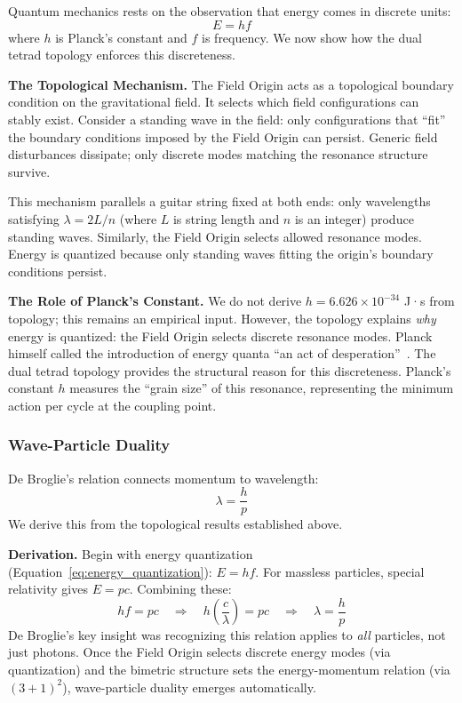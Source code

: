 \documentclass[aps,prd,preprint,superscriptaddress,showpacs,preprintnumbers,amsmath,amssymb,nofootinbib]{revtex4-2}
\begin{document}
Quantum mechanics rests on the observation that energy comes in discrete units:
\begin{equation}
E = hf
\label{eq:energy_quantization}
\end{equation}
where $h$ is Planck's constant and $f$ is frequency. We now show how the dual tetrad topology enforces this discreteness.

\textbf{The Topological Mechanism.}
The Field Origin acts as a topological boundary condition on the gravitational field. It selects which field configurations can stably exist. Consider a standing wave in the field: only configurations that ``fit'' the boundary conditions imposed by the Field Origin can persist. Generic field disturbances dissipate; only discrete modes matching the resonance structure survive.

This mechanism parallels a guitar string fixed at both ends: only wavelengths satisfying $\lambda = 2L/n$ (where $L$ is string length and $n$ is an integer) produce standing waves. Similarly, the Field Origin selects allowed resonance modes. Energy is quantized because only standing waves fitting the origin's boundary conditions persist.

\textbf{The Role of Planck's Constant.}
We do not derive $h = 6.626 \times 10^{-34}$ J·s from topology; this remains an empirical input. However, the topology explains \emph{why} energy is quantized: the Field Origin selects discrete resonance modes. Planck himself called the introduction of energy quanta ``an act of desperation''~\cite{planck1931}. The dual tetrad topology provides the structural reason for this discreteness. Planck's constant $h$ measures the ``grain size'' of this resonance, representing the minimum action per cycle at the coupling point.

\subsubsection*{Wave-Particle Duality}

De Broglie's relation connects momentum to wavelength:
\begin{equation}
\lambda = \frac{h}{p}
\label{eq:debroglie}
\end{equation}
We derive this from the topological results established above.

\textbf{Derivation.}
Begin with energy quantization (Equation~\ref{eq:energy_quantization}): $E = hf$. For massless particles, special relativity gives $E = pc$. Combining these:
\begin{equation}
hf = pc \quad \Rightarrow \quad h\left(\frac{c}{\lambda}\right) = pc \quad \Rightarrow \quad \lambda = \frac{h}{p}
\end{equation}
De Broglie's key insight was recognizing this relation applies to \emph{all} particles, not just photons. Once the Field Origin selects discrete energy modes (via quantization) and the bimetric structure sets the energy-momentum relation (via $(3+1)^2$), wave-particle duality emerges automatically.
\end{document}
